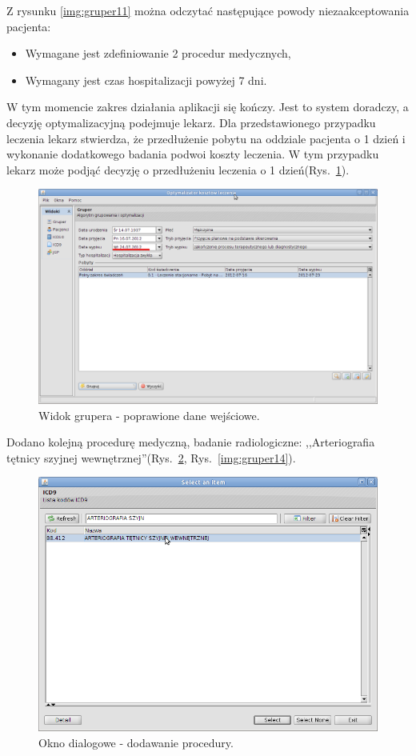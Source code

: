 Z rysunku \ref{img:gruper11} można odczytać następujące powody niezaakceptowania pacjenta:
\begin{itemize}
 \item Wymagane jest zdefiniowanie 2 procedur medycznych,
 \item Wymagany jest czas hospitalizacji powyżej 7 dni.
\end{itemize}

W tym momencie zakres działania aplikacji się kończy. Jest to system doradczy, a decyzję optymalizacyjną podejmuje lekarz. Dla przedstawionego przypadku leczenia lekarz stwierdza, że przedłużenie pobytu na oddziale pacjenta o 1 dzień i wykonanie dodatkowego badania podwoi koszty leczenia. W tym przypadku lekarz może podjąć decyzję o przedłużeniu leczenia o 1 dzień(Rys.~\ref{img:gruper12}).

\begin{figure}%
\centering
\includegraphics[scale=0.4]{images/gruper12}
\caption[Widok grupera]{Widok grupera - poprawione dane wejściowe.}
\label{img:gruper12}
\end{figure}

Dodano kolejną procedurę medyczną, badanie radiologiczne: ,,Arteriografia tętnicy szyjnej wewnętrznej''(Rys.~\ref{img:gruper13}, Rys.~\ref{img:gruper14}).

\begin{figure}%
\centering
\includegraphics[scale=0.4]{images/gruper13}
\caption[Widok grupera]{Okno dialogowe - dodawanie procedury.}
\label{img:gruper13}
\end{figure}

